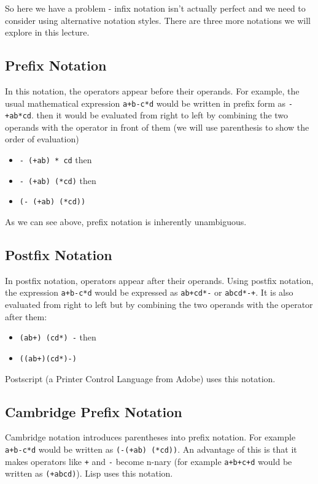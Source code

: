 So here we have a problem - infix notation isn't actually perfect and we need to consider using alternative notation styles. There are three more notations we will explore in this lecture.

\subsection{Prefix Notation}
In this notation, the operators appear before their operands. For example, the usual mathematical expression \verb|a+b-c*d| would be written in prefix form as \verb|-+ab*cd|. then it would be evaluated from right to left by combining the two operands with the operator in front of them (we will use parenthesis to show the order of evaluation)
\begin{itemize}
    \item \verb|- (+ab) * cd| then
    \item \verb|- (+ab) (*cd)| then
    \item \verb|(- (+ab) (*cd))|
\end{itemize}
As we can see above, prefix notation is inherently unambiguous. 

\subsection{Postfix Notation}
In postfix notation, operators appear after their operands. Using postfix notation, the expression \verb|a+b-c*d| would be expressed as \verb|ab+cd*-| or \verb|abcd*-+|. It is also evaluated from right to left but by combining the two operands with the operator after them:
\begin{itemize}
    \item \verb|(ab+) (cd*) -| then
    \item \verb|((ab+)(cd*)-)|
\end{itemize}
Postscript (a Printer Control Language from Adobe) uses this notation. 

\subsection{Cambridge Prefix Notation}
Cambridge notation introduces parentheses into prefix notation. For example \verb|a+b-c*d| would be written as \verb|(-(+ab) (*cd))|. An advantage of this is that it makes operators like \verb|+| and \verb|-| become n-nary (for example \verb|a+b+c+d| would be written as \verb|(+abcd)|). Lisp uses this notation.

